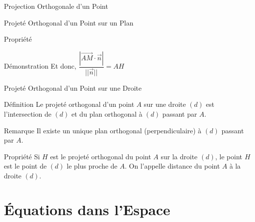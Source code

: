 \documentclass{coursbook}
\begin{document}
\begin{Gpartie}{Projection Orthogonale d'un Point}
\begin{Spartie}{Projeté Orthogonal d'un Point sur un Plan}
\begin{SSSpartie}{Propriété}
\begin{SSSSpartie}{Démonstration}
                    Et donc, $\dfrac{\left\lvert\overrightarrow{AM}\cdot\vec{n}\right\rvert}{\lvert\lvert\vec{n}\rvert\rvert}=AH$
                \end{SSSSpartie}
            \end{SSSpartie}
        \end{Spartie}
        \begin{Spartie}{Projeté Orthogonal d'un Point sur une Droite} 
            \begin{SSpartie}{Définition} 
                Le projeté orthogonal d'un point $A$ sur une droite $(d)$ est l'intersection de $(d)$ et du plan orthogonal à $(d)$ passant par $A$.
            \end{SSpartie}
            \begin{SSpartie}{Remarque} 
                Il existe un unique plan orthogonal (perpendiculaire) à $(d)$ passant par $A$.
            \end{SSpartie}
            \begin{SSpartie}{Propriété} 
                Si $H$ est le projeté orthogonal du point $A$ sur la droite $(d)$, le point $H$ est le point de $(d)$ le plus proche de $A$. On l'appelle distance du point $A$ à la droite $(d)$.
            \end{SSpartie}
        \end{Spartie}
    \end{Gpartie}






    \chapter{Équations dans l'Espace}
\end{document}
